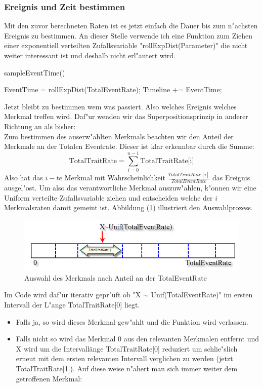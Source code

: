 \documentclass[11pt, a4paper, german]{article}
\begin{document}
	\subsubsection{Ereignis und Zeit bestimmen}
	
	Mit den zuvor berechneten Raten ist es jetzt einfach die Dauer bis zum n"achsten Ereignis zu bestimmen. An dieser Stelle verwende ich eine Funktion zum Ziehen einer exponentiell verteilten Zufallsvariable "{}rollExpDist(Parameter)"{} die nicht weiter interessant ist und deshalb nicht erl"autert wird.
 	\begin{algorithm}[H]
 		\caption{sampleEventTime()}
 		\begin{algorithmic}[1]
 			\STATE EventTime = rollExpDist(TotalEventRate);
 			\STATE Timeline += EventTime;
 		\end{algorithmic}
 	\end{algorithm}
 	Jetzt bleibt zu bestimmen wem was passiert. Also welches Ereignis welches Merkmal treffen wird. Daf"ur wenden wir das Superpositionsprinzip in anderer Richtung an als bisher:\\
 	Zum bestimmen des auserw"ahlten Merkmals beachten wir den Anteil der Merkmale an der Totalen Eventrate. Dieser ist klar erkennbar durch die Summe:
 	\[ \text{TotalTraitRate} = \sum_{i = 0}^{n - 1} \text{TotalTraitRate[i]} \]
 	Also hat das $ i-te $ Merkmal mit Wahrscheinlichkeit $ \frac{TotalTraitRate[i]}{TotalEventRate} $ das Ereignis ausgel"ost. Um also das verantwortliche Merkmal auszuw"ahlen, k"onnen wir eine Uniform verteilte Zufallsvariable ziehen und entscheiden welche der $ i $ Merkmalsraten damit gemeint ist. Abbildung (\ref{SelectTrait}) illustriert den Auswahlprozess.
 	\begin{figure}[H]
		\centering
		\includegraphics[width=1\linewidth]{./Pictures/SelectTrait}
		\caption[]{Auswahl des Merkmals nach Anteil an der TotalEventRate}
		\label{SelectTrait}
	\end{figure}
	Im Code wird daf"ur iterativ gepr"uft ob "{}X $ \sim $ Unif(TotalEventRate)"{} im ersten Intervall der L"ange TotalTraitRate[0] liegt. 
	\begin{itemize}
		\item[] Falls ja, so wird dieses Merkmal gew"ahlt und die Funktion wird verlassen.
		\item[] Falls nicht so wird das Merkmal $ 0 $ aus den relevanten Merkmalen entfernt und X wird um die Intervallänge TotalTraitRate[0] reduziert um schlie"slich erneut mit dem ersten relevanten Intervall verglichen zu werden (jetzt TotalTraitRate[1]). Auf diese weise n"ahert man sich immer weiter dem getroffenen Merkmal:
	\end{itemize}
\end{document}
